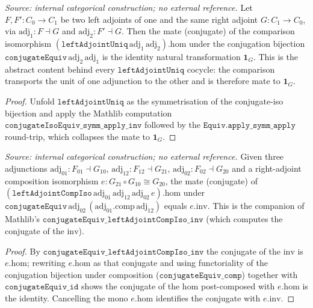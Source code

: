 \begin{lemma}
  \label{lem:conjugate_equiv_leftadjointuniq_hom}
  \textit{Source: internal categorical construction; no external reference.}
  Let \(F, F' : C_0 \to C_1\) be two left adjoints of one and the same right adjoint
  \(G : C_1 \to C_0\), via \(\mathrm{adj}_1 : F \dashv G\) and \(\mathrm{adj}_2 : F' \dashv G\). Then the
  mate (conjugate) of the comparison isomorphism \((\mathtt{leftAdjointUniq}\,\mathrm{adj}_1\,\mathrm{adj}_2).\mathrm{hom}\)
  under the conjugation bijection \(\mathtt{conjugateEquiv}\,\mathrm{adj}_2\,\mathrm{adj}_1\) is the identity
  natural transformation \(\mathbf{1}_G\). This is the abstract content behind every
  \(\mathtt{leftAdjointUniq}\) cocycle: the comparison transports the unit of one adjunction to the
  other and is therefore mate to \(\mathbf{1}_G\).
\end{lemma}
\begin{proof}


\leanok
  Unfold \(\mathtt{leftAdjointUniq}\) as the symmetrisation of the conjugate-iso bijection and apply the
  Mathlib computation \(\mathtt{conjugateIsoEquiv\_symm\_apply\_inv}\) followed by the
  \(\mathtt{Equiv.apply\_symm\_apply}\) round-trip, which collapses the mate to \(\mathbf{1}_G\).
\end{proof}

\begin{lemma}
  \label{lem:conjugate_equiv_leftadjointcompiso_hom}
  \textit{Source: internal categorical construction; no external reference.}
  Given three adjunctions \(\mathrm{adj}_{01} : F_{01} \dashv G_{10}\),
  \(\mathrm{adj}_{12} : F_{12} \dashv G_{21}\), \(\mathrm{adj}_{02} : F_{02} \dashv G_{20}\) and a
  right-adjoint composition isomorphism \(e : G_{21} \circ G_{10} \cong G_{20}\), the mate (conjugate)
  of \((\mathtt{leftAdjointCompIso}\,\mathrm{adj}_{01}\,\mathrm{adj}_{12}\,\mathrm{adj}_{02}\,e).\mathrm{hom}\)
  under \(\mathtt{conjugateEquiv}\,\mathrm{adj}_{02}\,(\mathrm{adj}_{01}.\mathrm{comp}\,\mathrm{adj}_{12})\)
  equals \(e.\mathrm{inv}\). This is the companion of Mathlib's
  \(\mathtt{conjugateEquiv\_leftAdjointCompIso\_inv}\) (which computes the conjugate of the \(\mathrm{inv}\)).
\end{lemma}
\begin{proof}


\leanok
  By \(\mathtt{conjugateEquiv\_leftAdjointCompIso\_inv}\) the conjugate of the \(\mathrm{inv}\) is
  \(e.\mathrm{hom}\); rewriting \(e.\mathrm{hom}\) as that conjugate and using functoriality of the
  conjugation bijection under composition (\(\mathtt{conjugateEquiv\_comp}\)) together with
  \(\mathtt{conjugateEquiv\_id}\) shows the conjugate of the \(\mathrm{hom}\) post-composed with
  \(e.\mathrm{hom}\) is the identity. Cancelling the mono \(e.\mathrm{hom}\) identifies the conjugate
  with \(e.\mathrm{inv}\).
\end{proof}

